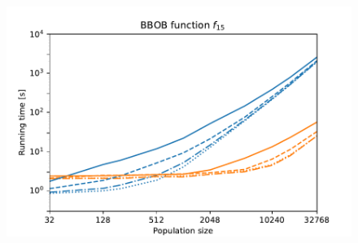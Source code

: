 \begin{figure}[ht!]
\begin{minipage}[t]{0.32\textwidth}
    \end{minipage}
    \hfill
    \begin{minipage}[t]{0.32\textwidth}
        \centering
        \includegraphics[width=\textwidth]{img/runs/time_pso2006_fn15_alldim.pdf}
    \end{minipage}


\end{figure}
